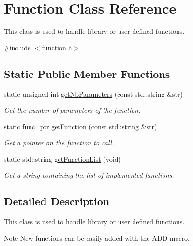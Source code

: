 \hypertarget{class_function}{}\section{Function Class Reference}
\label{class_function}


This class is used to handle library or user defined functions.  




{\ttfamily \#include $<$function.\+h$>$}

\subsection*{Static Public Member Functions}
\begin{DoxyCompactItemize}
\item 
static unsigned int \hyperlink{class_function_a3cc694137e1698d0537d9e4672a7123a}{get\+Nb\+Parameters} (const std\+::string \&str)
\begin{DoxyCompactList}\small\item\em Get the number of parameters of the function. \end{DoxyCompactList}\item 
static \hyperlink{function_8h_a171e664ee3179d3d1f1a7b04a747724c}{func\+\_\+ptr} \hyperlink{class_function_a58dbf2a69e3cd7a82acff3ea70e642f4}{get\+Function} (const std\+::string \&str)
\begin{DoxyCompactList}\small\item\em Get a pointer on the function to call. \end{DoxyCompactList}\item 
static std\+::string \hyperlink{class_function_a321f973005de0842251559fb2ab52160}{get\+Function\+List} (void)
\begin{DoxyCompactList}\small\item\em Get a string containing the list of implemented functions. \end{DoxyCompactList}\end{DoxyCompactItemize}


\subsection{Detailed Description}
This class is used to handle library or user defined functions. 

\begin{DoxyNote}{Note}
New functions can be easily added with the A\+D\+D macro. 
\end{DoxyNote}


